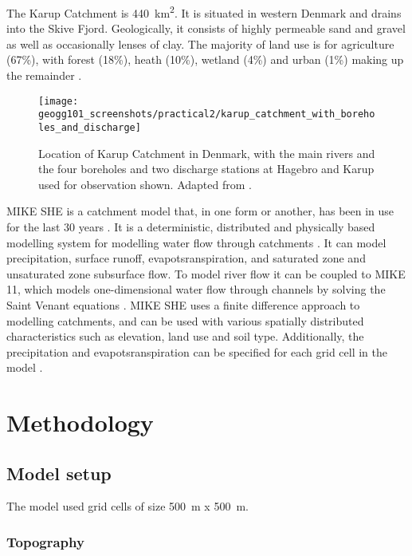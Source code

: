\documentclass{article}
\begin{document}
The Karup Catchment is \SI{440}{km^2}. It is situated in western Denmark and drains into the Skive Fjord. Geologically, it consists of highly permeable sand and gravel as well as occasionally lenses of clay. 
The majority of land use is for agriculture (67\%), with forest (18\%), heath (10\%), wetland (4\%) and urban (1\%) making up the remainder \parencite{refsgaard1997parameterisation}.

\begin{figure}[!h]
    \centering
    \texttt{[image: geogg101\_screenshots/practical2/karup\_catchment\_with\_boreholes\_and\_discharge]}
    \caption{Location of Karup Catchment in Denmark, with the main rivers and the four boreholes and two discharge stations at Hagebro and Karup used for observation shown. Adapted from \textcite{blasone2008uncertainty}.}
    \label{fig:karup_catchment}
\end{figure}

MIKE SHE is a catchment model that, in one form or another, has been in use for the last 30 years \parencite{refsgaard2010systeme}. It is a deterministic, distributed and physically based modelling system for modelling water flow through catchments \parencite{refsgaard1995mike}. It can model precipitation, surface runoff, evapotsranspiration, and saturated zone and unsaturated zone subsurface flow. To model river flow it can be coupled to MIKE 11, which models one-dimensional water flow through channels by solving the Saint Venant equations \parencite{havno1995mike}.  
MIKE SHE uses a finite difference approach to modelling catchments, and can be used with various spatially distributed characteristics such as elevation, land use and soil type. Additionally, the precipitation and evapotsranspiration can be specified for each grid cell in the model \parencite{thompson2012modelling}.

\newpage
\section{Methodology}

\subsection{Model setup}

The model used grid cells of size \SI{500}{m} x \SI{500}{m}.

\subsubsection{Topography}
\end{document}

